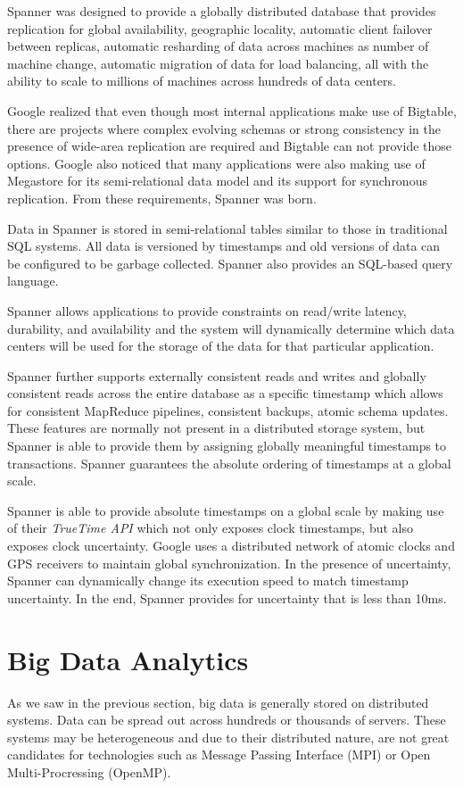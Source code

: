 \documentclass[]{article}
\begin{document}
Spanner was designed to provide a globally distributed database that provides replication for global availability, geographic locality, automatic client failover between replicas, automatic resharding of data across machines as number of machine change, automatic migration of data for load balancing, all with the ability to scale to millions of machines across hundreds of data centers.

Google realized that even though most internal applications make use of Bigtable, there are projects where complex evolving schemas or strong consistency in the presence of wide-area replication are required and Bigtable can not provide those options. Google also noticed that many applications were also making use of Megastore for its semi-relational data model and its support for synchronous replication. From these requirements, Spanner was born.

Data in Spanner is stored in semi-relational tables similar to those in traditional SQL systems. All data is versioned by timestamps and old versions of data can be configured to be garbage collected. Spanner also provides an SQL-based query language.

Spanner allows applications to provide constraints on read/write latency, durability, and availability and the system will dynamically determine which data centers will be used for the storage of the data for that particular application.

Spanner further supports externally consistent reads and writes and globally consistent reads across the entire database as a specific timestamp which allows for consistent MapReduce pipelines, consistent backups, atomic schema updates. These features are normally not present in a distributed storage system, but Spanner is able to provide them by assigning globally meaningful timestamps to transactions. Spanner guarantees the absolute ordering of timestamps at a global scale.

Spanner is able to provide absolute timestamps on a global scale by making use of their \textit{TrueTime API} which not only exposes clock timestamps, but also exposes clock uncertainty. Google uses a distributed network of atomic clocks and GPS receivers to maintain global synchronization. In the presence of uncertainty, Spanner can dynamically change its execution speed to match timestamp uncertainty. In the end, Spanner provides for uncertainty that is less than 10ms.


\section{Big Data Analytics} \label{sec:big-data-analytics}
As we saw in the previous section, big data is generally stored on distributed systems. Data can be spread out across hundreds or thousands of servers. These systems may be heterogeneous and due to their distributed nature, are not great candidates for technologies such as Message Passing Interface (MPI) or Open Multi-Procressing (OpenMP)\cite{chen_big_2014}. 
\end{document}
